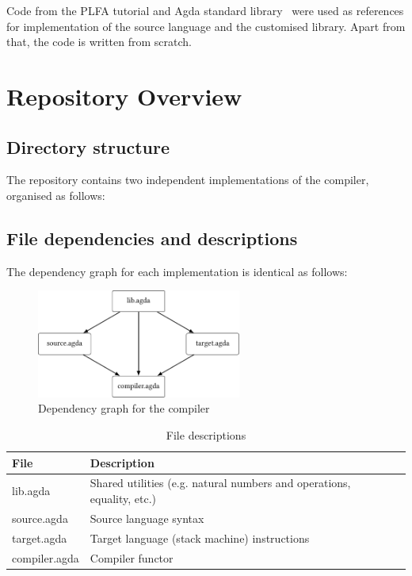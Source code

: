 \documentclass[12pt,twoside,a4paper]{report}
\theoremstyle{definition}
\theoremstyle{definition}
\theoremstyle{definition}
\theoremstyle{definition}
\begin{document}
    Code from the PLFA tutorial and Agda standard library~\cite{agda_std} were used as references for implementation of the source language and the customised library. Apart from that, the code is written from scratch.

    \section{Repository Overview}
        \subsection{Directory structure}
        The repository contains two independent implementations of the compiler, organised as follows:

        \subsection{File dependencies and descriptions}
        The dependency graph for each implementation is identical as follows:
        \begin{figure}[H]
            \centering
            \includegraphics[width=0.6\textwidth]{dependencies.pdf}
            \caption{Dependency graph for the compiler}
            \label{fig: dependencies}
        \end{figure}

        \begin{table}[H]
            \centering
            \begin{tabular}{l l l}
                \hline
                \textbf{File} & \textbf{Description}\\
                \hline
                lib.agda & Shared utilities (e.g. natural numbers and operations, equality, etc.) \\
                source.agda & Source language syntax \\
                target.agda & Target language (stack machine) instructions \\
                compiler.agda & Compiler functor \\
                \hline
            \end{tabular}
            \caption{File descriptions}
            \label{tab: file_descriptions}
        \end{table}
\end{document}

